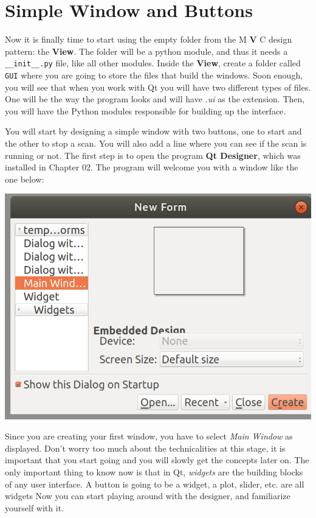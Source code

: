 \section{Simple Window and Buttons}\label{section:simple-window-andbuttons}
Now it is finally time to start using the empty folder from the M
\textbf{V} C design pattern: the \textbf{View}. The folder will be a
python module, and thus it needs a \texttt{__init__.py} file, like
all other modules. Inside the \textbf{View}, create a folder called
\texttt{GUI} where you are going to store the files that build the
windows. Soon enough, you will see that when you work with Qt you will
have two different types of files. One will be the way the program looks
and will have \emph{.ui} as the extension. Then, you will have the
Python modules responsible for building up the interface.

You will start by designing a simple window with two buttons, one to
start and the other to stop a scan. You will also add a line where you
can see if the scan is running or not. The first step is to open the
program \textbf{Qt Designer}, which was installed in Chapter 02. The
program will welcome you with a window like the one below:

\begin{center}
\includegraphics[width=.6\textwidth]{images/qt_designer_welcome.png}
\end{center}

Since you are creating your first window, you have to select \emph{Main
Window} as displayed. Don't worry too much about the technicalities at
this stage, it is important that you start going and you will slowly get
the concepts later on. The only important thing to know now is that in
Qt, \emph{widgets} are the building blocks of any user interface. A
button is going to be a widget, a plot, slider, etc. are all widgets Now
you can start playing around with the designer, and familiarize yourself
with it.

